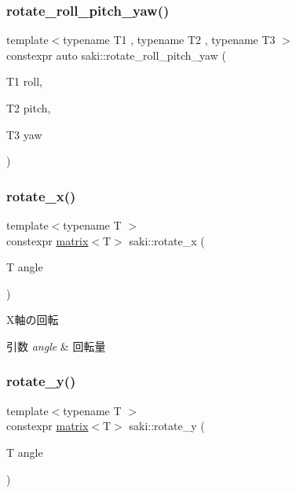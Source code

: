 \mbox{\label{namespacesaki_a1e89f783c61c36d9885c70d966218dc0}} 
\subsubsection{\texorpdfstring{rotate\+\_\+roll\+\_\+pitch\+\_\+yaw()}{rotate\_roll\_pitch\_yaw()}}
{\footnotesize\ttfamily template$<$typename T1 , typename T2 , typename T3 $>$ \\
constexpr auto saki\+::rotate\+\_\+roll\+\_\+pitch\+\_\+yaw (\begin{DoxyParamCaption}\item[{T1}]{roll,  }\item[{T2}]{pitch,  }\item[{T3}]{yaw }\end{DoxyParamCaption})}

\mbox{\label{namespacesaki_a1a0f91a98432f3bbfe95892d3b547c1a}} 
\subsubsection{\texorpdfstring{rotate\+\_\+x()}{rotate\_x()}}
{\footnotesize\ttfamily template$<$typename T $>$ \\
constexpr \mbox{\hyperlink{classsaki_1_1matrix}{matrix}}$<$T$>$ saki\+::rotate\+\_\+x (\begin{DoxyParamCaption}\item[{T}]{angle }\end{DoxyParamCaption})}



X軸の回転 


\begin{DoxyParams}{引数}
{\em angle} & 回転量 \\
\hline
\end{DoxyParams}
\mbox{\label{namespacesaki_a0d794fa366b6fdf189b5b242730d020e}} 
\subsubsection{\texorpdfstring{rotate\+\_\+y()}{rotate\_y()}}
{\footnotesize\ttfamily template$<$typename T $>$ \\
constexpr \mbox{\hyperlink{classsaki_1_1matrix}{matrix}}$<$T$>$ saki\+::rotate\+\_\+y (\begin{DoxyParamCaption}\item[{T}]{angle }\end{DoxyParamCaption})}



